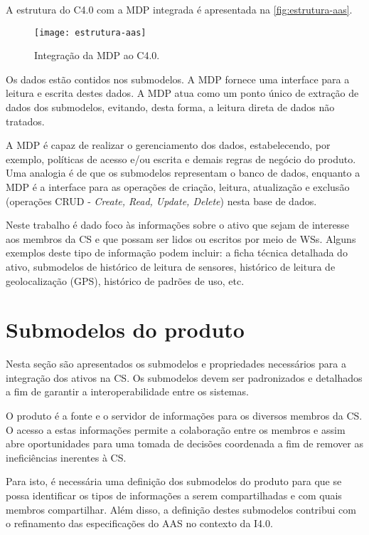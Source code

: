 A estrutura do C4.0 com a MDP integrada é apresentada na \autoref{fig:estrutura-aas}.

\begin{figure}[t]
	\centering
	\texttt{[image: estrutura-aas]}
	\caption{Integração da MDP ao C4.0.}
	\label{fig:estrutura-aas}
\end{figure}

Os dados estão contidos nos submodelos. A MDP fornece uma interface para a leitura e escrita destes dados. A MDP atua como um ponto único de extração de dados dos submodelos, evitando, desta forma, a leitura direta de dados não tratados.

A MDP é capaz de realizar o gerenciamento dos dados, estabelecendo, por exemplo, políticas de acesso e/ou escrita e demais regras de negócio do produto. Uma analogia é de que os submodelos representam o banco de dados, enquanto a MDP é a interface para as operações de criação, leitura, atualização e exclusão (operações CRUD - \textit{Create, Read, Update, Delete}) nesta base de dados.

Neste trabalho é dado foco às informações sobre o ativo que sejam de interesse aos membros da CS e que possam ser lidos ou escritos por meio de WSs. Alguns exemplos deste tipo de informação podem incluir: a ficha técnica detalhada do ativo, submodelos de histórico de leitura de sensores, histórico de leitura de geolocalização (GPS), histórico de padrões de uso, etc.

\section{Submodelos do produto}
\label{sec:submodelos-produto}

Nesta seção são apresentados os submodelos e propriedades necessários para a integração dos ativos na CS. Os submodelos devem ser padronizados e detalhados a fim de garantir a interoperabilidade entre os sistemas.

O produto é a fonte e o servidor de informações para os diversos membros da CS. O acesso a estas informações permite a colaboração entre os membros e assim abre oportunidades para uma tomada de decisões coordenada a fim de remover as ineficiências inerentes à CS.

Para isto, é necessária uma definição dos submodelos do produto para que se possa identificar os tipos de informações a serem compartilhadas e com quais membros compartilhar. Além disso, a definição destes submodelos contribui com o refinamento das especificações do AAS no contexto da I4.0.

